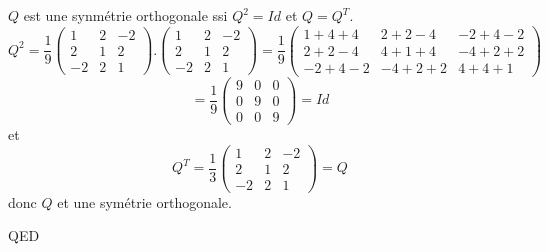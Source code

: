 \documentclass[]{book}
\theoremstyle{definition}
\begin{document}
$Q$ est une synm\'etrie orthogonale ssi $Q^2 = Id$ et $Q=Q^T$.
$$Q^2 = \frac{1}{9}\begin{pmatrix} 1 & 2 & -2 \\ 2 & 1 & 2 \\ -2 & 2 & 1 \end{pmatrix}.\begin{pmatrix} 1 & 2 & -2 \\ 2 & 1 & 2 \\ -2 & 2 & 1 \end{pmatrix} = \frac{1}{9}\begin{pmatrix} 1+4+4 & 2+2-4 & -2+4-2 \\ 2+2-4 & 4+1+4 & -4+2+2 \\ -2+4-2 & -4+2+2 & 4+4+1 \end{pmatrix} $$
$$= \frac{1}{9}\begin{pmatrix} 9 & 0 & 0 \\ 0 & 9 & 0 \\ 0 & 0 & 9 \end{pmatrix} = Id$$
et 
$$Q^T = \frac{1}{3}\begin{pmatrix} 1 & 2 & -2 \\ 2 & 1 & 2 \\ -2 & 2 & 1 \end{pmatrix} = Q$$
donc
$Q$ et une sym\'etrie orthogonale.

QED
\end{document}
